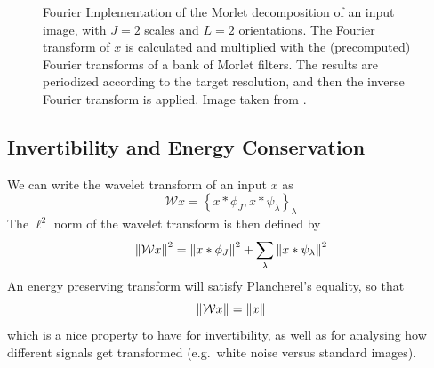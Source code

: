   \begin{figure}
    \centering
      \caption[Fourier Implementation of the Morlet decomposition of an input
              image]
              {Fourier Implementation of the Morlet decomposition of an input
              image, with $J=2$ scales and $L=2$ orientations. The Fourier
              transform of $x$ is calculated and multiplied with the
              (precomputed) Fourier transforms of a bank of Morlet filters. The
              results are periodized according to the target resolution, and
              then the inverse Fourier transform is applied. Image taken from
              \citep{sifre_rigid-motion_2014-1}.}
      \label{fig:morlet_fourier_process}
  \end{figure}

\subsection{Invertibility and Energy Conservation}
  We can write the wavelet transform of an input $x$ as 
  \begin{equation}
    \mathcal{W}x = \left\{x \ast \phi_J, x \ast \psi_{\lambda}
    \right\}_{\lambda}
  \end{equation}
  The $\ell^2$ norm of the wavelet transform is then defined by
  \begin{equation}
    \left\lVert \mathcal{W}x \right\rVert^2 = \left\lVert x\ast\phi_J \right\rVert^2 + \sum_{\lambda}\left\lVert x \ast
      \psi_\lambda \right\rVert^2
  \end{equation}
  An energy preserving transform will satisfy Plancherel's equality, so that
  \begin{equation}
    \left\lVert \mathcal{W}x \right\rVert = \left\lVert x \right\rVert
  \end{equation}
  which is a nice property to have for invertibility, as well as for analysing
  how different signals get transformed (e.g.\ white noise versus standard
  images).
  
